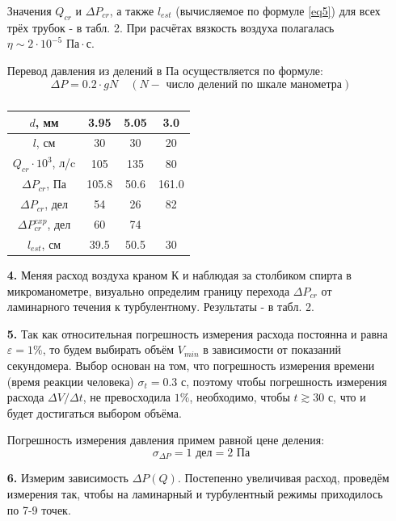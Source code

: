 \documentclass[a4paper]{article}
\begin{document}
\begin{itemize}
Значения $Q_{cr}$ и $\Delta P_{cr}$, а также $l_{est}$ (вычисляемое по формуле \eqref{eq5}) для всех трёх трубок - в табл. 2. При расчётах вязкость воздуха полагалась $\eta \sim 2 \cdot 10^{-5} \text{ Па} \cdot \text{с}$.

\noindent
Перевод давления из делений в Па осуществляется по формуле:
\[\Delta P = 0.2 \cdot g N \quad (N - \text{ число делений по шкале манометра})\]

\begin{table}[]
\centering
\begin{tabular}{|c|c|c|c|}
\hline
$d$, мм                   & 3.95  & 5.05  & 3.0   \\ \hline
$l$, см                   & 30    & 30    & 20    \\ \hline
$Q_{cr} \cdot 10^{3}$, л/c             & 105 & 135 & 80 \\ \hline
$\Delta P_{cr}$, Па       & 105.8 & 50.6  & 161.0 \\ \hline
$\Delta P_{cr}$, дел      & 54    & 26    & 82    \\ \hline
$\Delta P_{cr}^{exp}$, дел & 60    & 74    &       \\ \hline
$l_{est}$, см             & 39.5  & 50.5  & 30    \\ \hline
\end{tabular}
\caption{}
\end{table}

\item[\textbf{4. }] Меняя расход воздуха краном К и наблюдая за столбиком спирта в микроманометре, визуально определим границу перехода $\Delta P_{cr}$ от ламинарного течения к турбулентному.
Результаты - в табл. 2.
\item[\textbf{5. }] Так как относительная погрешность измерения расхода постоянна и равна $\varepsilon = 1\%$, то будем выбирать объём $V_{min}$ в зависимости от показаний секундомера. Выбор основан на том, что погрешность измерения времени (время реакции человека) $\sigma_t = 0.3$ с, поэтому чтобы погрешность измерения расхода $\Delta V/ \Delta t$, не превосходила $1 \%$, необходимо, чтобы $t \gtrsim 30$ с, что и будет достигаться выбором объёма.

\noindent
Погрешность измерения давления примем равной цене деления:
\[\sigma_{\Delta P} = 1 \text{ дел} = 2 \text{ Па} \]
\item[\textbf{6. }] Измерим зависимость $\Delta P (Q)$. Постепенно увеличивая расход, проведём измерения так, чтобы на ламинарный и турбулентный режимы приходилось по 7-9 точек. 


\end{itemize}
\end{document}
